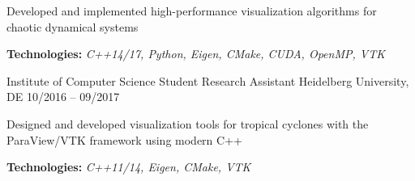 \begin{cventries}
{\begin{cvitems}
        \item {Developed and implemented high-performance visualization algorithms for chaotic dynamical systems}
        \item {\textbf{Technologies:} \textit{C++14/17, Python, Eigen, CMake, CUDA, OpenMP, VTK}}
      \end{cvitems}
    }
    \cventry
    {Institute of Computer Science}
    {Student Research Assistant}
    {Heidelberg University, DE}
    {10/2016 -- 09/2017}
    {
      \begin{cvitems}
        \item {Designed and developed visualization tools for tropical cyclones with the ParaView/VTK framework using modern C++}
        \item {\textbf{Technologies:} \textit{C++11/14, Eigen, CMake, VTK}}
      \end{cvitems}
    }
\end{cventries}
